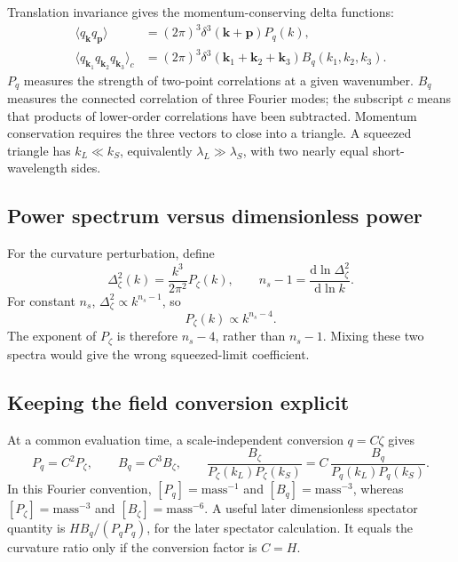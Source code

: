 \documentclass[11pt,a4paper]{article}
\newcommand{\dd}{\mathrm{d}}
\begin{document}
Translation invariance gives the momentum-conserving delta functions:
\begin{align}
\langle q_{\bm{k}}q_{\bm{p}}\rangle
&=(2\pi)^3\delta^3(\bm{k}+\bm{p})P_q(k),\label{eq:power}\\
\langle q_{\bm{k}_1}q_{\bm{k}_2}q_{\bm{k}_3}\rangle_c
&=(2\pi)^3\delta^3(\bm{k}_1+\bm{k}_2+\bm{k}_3)
B_q(k_1,k_2,k_3).\label{eq:bispectrum}
\end{align}
$P_q$ measures the strength of two-point correlations at a given wavenumber. $B_q$ measures the connected correlation of three Fourier modes; the subscript $c$ means that products of lower-order correlations have been subtracted. Momentum conservation requires the three vectors to close into a triangle. A squeezed triangle has $k_L\ll k_S$, equivalently $\lambda_L\gg\lambda_S$, with two nearly equal short-wavelength sides.

\subsection{Power spectrum versus dimensionless power}
For the curvature perturbation, define
\begin{equation}
\Delta_\zeta^2(k)=\frac{k^3}{2\pi^2}P_\zeta(k),\qquad
n_s-1=\frac{\dd\ln\Delta_\zeta^2}{\dd\ln k}.
\label{eq:tilt}
\end{equation}
For constant $n_s$, $\Delta_\zeta^2\propto k^{n_s-1}$, so
\begin{equation}
P_\zeta(k)\propto k^{n_s-4}.
\label{eq:powerlaw}
\end{equation}
The exponent of $P_\zeta$ is therefore $n_s-4$, rather than $n_s-1$. Mixing these two spectra would give the wrong squeezed-limit coefficient.

\subsection{Keeping the field conversion explicit}
At a common evaluation time, a scale-independent conversion $q=C\zeta$ gives
\begin{equation}
P_q=C^2P_\zeta,\qquad B_q=C^3B_\zeta,\qquad
\frac{B_\zeta}{P_\zeta(k_L)P_\zeta(k_S)}
=C\,\frac{B_q}{P_q(k_L)P_q(k_S)}.
\end{equation}
In this Fourier convention, $[P_q]=\text{mass}^{-1}$ and $[B_q]=\text{mass}^{-3}$, whereas $[P_\zeta]=\text{mass}^{-3}$ and $[B_\zeta]=\text{mass}^{-6}$. A useful later dimensionless spectator quantity is $H B_q/(P_qP_q)$, for the later spectator calculation. It equals the curvature ratio only if the conversion factor is $C=H$.
\end{document}
